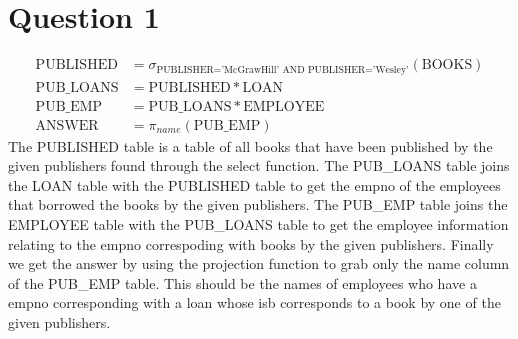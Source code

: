 \documentclass{article}
\begin{document}






\section*{Question 1}
\begin{align*}
    \text{PUBLISHED} &= \sigma_{\text{PUBLISHER='McGrawHill' AND PUBLISHER='Wesley'}}(\text{BOOKS})\\
    \text{PUB\_LOANS} &= \text{PUBLISHED} * \text{LOAN}\\
    \text{PUB\_EMP} &= \text{PUB\_LOANS} * \text{EMPLOYEE}\\
    \text{ANSWER} &= \pi_{name}(\text{PUB\_EMP})
\end{align*}
The PUBLISHED table is a table of all books that have been published by the given publishers found through the select function. The PUB\_LOANS table joins the LOAN table with the PUBLISHED table to get the empno of the employees that borrowed the books by the given publishers. The PUB\_EMP table joins the EMPLOYEE table with the PUB\_LOANS table to get the employee information relating to the empno correspoding with books by the given publishers. Finally we get the answer by using the projection function to grab only the name column of the PUB\_EMP table. This should be the names of employees who have a empno corresponding with a loan whose isb corresponds to a book by one of the given publishers.
\end{document}
